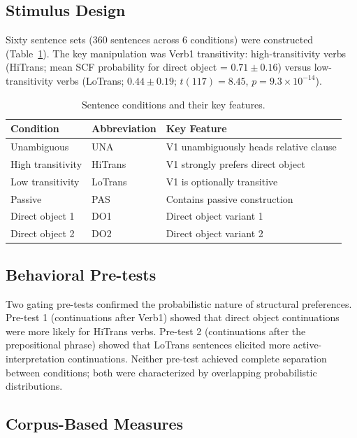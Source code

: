 \documentclass[12pt]{article}
\begin{document}
\subsection{Stimulus Design}

Sixty sentence sets (360 sentences across 6 conditions) were constructed (Table~\ref{tab:conditions}). The key manipulation was Verb1 transitivity: high-transitivity verbs (HiTrans; mean SCF probability for direct object = $0.71 \pm 0.16$) versus low-transitivity verbs (LoTrans; $0.44 \pm 0.19$; $t(117) = 8.45$, $p = 9.3 \times 10^{-14}$).

\begin{table}[htbp]
\centering
\caption{Sentence conditions and their key features.}
\label{tab:conditions}
\begin{tabular}{lll}
\toprule
Condition & Abbreviation & Key Feature \\
\midrule
Unambiguous & UNA & V1 unambiguously heads relative clause \\
High transitivity & HiTrans & V1 strongly prefers direct object \\
Low transitivity & LoTrans & V1 is optionally transitive \\
Passive & PAS & Contains passive construction \\
Direct object 1 & DO1 & Direct object variant 1 \\
Direct object 2 & DO2 & Direct object variant 2 \\
\bottomrule
\end{tabular}
\end{table}

\subsection{Behavioral Pre-tests}

Two gating pre-tests confirmed the probabilistic nature of structural preferences. Pre-test 1 (continuations after Verb1) showed that direct object continuations were more likely for HiTrans verbs. Pre-test 2 (continuations after the prepositional phrase) showed that LoTrans sentences elicited more active-interpretation continuations. Neither pre-test achieved complete separation between conditions; both were characterized by overlapping probabilistic distributions.

\subsection{Corpus-Based Measures}
\end{document}
